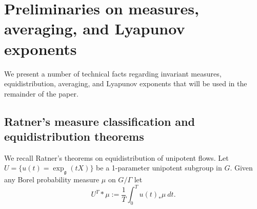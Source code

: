 \documentclass[10pt,reqno]{amsart}
\theoremstyle{Theorem}
\newtheorem{lemma}[theorem]{Lemma}
\theoremstyle{definition}
\theoremstyle{remark}
\newcommand{\td}{\tilde}
\def\calF{\mathcal F}
\newcommand{\lieg}{\mathfrak g}
\begin{document}






\section{Preliminaries on measures, averaging, and Lyapunov exponents}
\label{section:preliminaries}

We present a number of technical facts regarding invariant measures, equidistribution, averaging, and Lyapunov exponents  that will be used in the remainder of the paper.

\subsection{Ratner's measure classification and equidistribution theorems}
We recall Ratner's theorems on equidistribution of unipotent flows.
Let $U = \{u(t) = \exp_\lieg (t X)\}$ be a 1-parameter unipotent subgroup in $G$.
Given any Borel probability measure $\mu$ on $G/\Gamma$ let
$$U^T\ast \mu := \frac 1 T \int_0^T  u(t)_* \mu \ d t.$$
\end{document}

